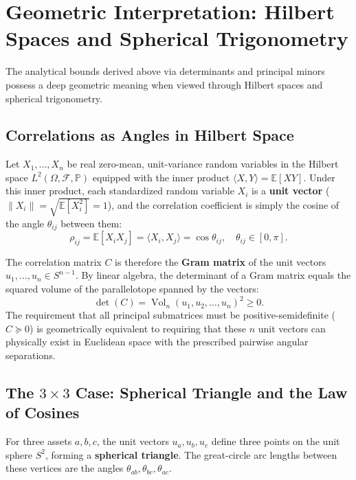 \documentclass[a4paper]{article}
\begin{document}
\section{Geometric Interpretation: Hilbert Spaces and Spherical Trigonometry}\label{spd:sec:geometric}

The analytical bounds derived above via determinants and principal minors possess a deep geometric meaning when viewed through Hilbert spaces and spherical trigonometry.

\subsection{Correlations as Angles in Hilbert Space}
Let $X_1, \dots, X_n$ be real zero-mean, unit-variance random variables in the Hilbert space $L^2(\Omega, \mathcal{F}, \mathbb{P})$ equipped with the inner product $\langle X, Y \rangle = \mathbb{E}[XY]$. Under this inner product, each standardized random variable $X_i$ is a \textbf{unit vector} ($\|X_i\| = \sqrt{\mathbb{E}[X_i^2]} = 1$), and the correlation coefficient is simply the cosine of the angle $\theta_{ij}$ between them:
\begin{equation}
\rho_{ij} = \mathbb{E}[X_i X_j] = \langle X_i, X_j \rangle = \cos \theta_{ij}, \quad \theta_{ij} \in [0, \pi].
\end{equation}

The correlation matrix $C$ is therefore the \textbf{Gram matrix} of the unit vectors $u_1, \dots, u_n \in S^{n-1}$. By linear algebra, the determinant of a Gram matrix equals the squared volume of the parallelotope spanned by the vectors:
\begin{equation}
\det(C) = \operatorname{Vol}_n(u_1, u_2, \dots, u_n)^2 \geq 0.
\end{equation}
The requirement that all principal submatrices must be positive-semidefinite ($C \succeq 0$) is geometrically equivalent to requiring that these $n$ unit vectors can physically exist in Euclidean space with the prescribed pairwise angular separations.

\subsection{The \texorpdfstring{$3 \times 3$}{3x3} Case: Spherical Triangle and the Law of Cosines}
For three assets $a, b, c$, the unit vectors $u_a, u_b, u_c$ define three points on the unit sphere $S^2$, forming a \textbf{spherical triangle}. The great-circle arc lengths between these vertices are the angles $\theta_{ab}, \theta_{bc}, \theta_{ac}$.
\end{document}
